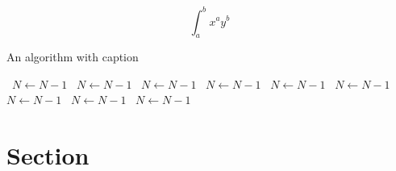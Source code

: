 \documentclass[a4paper]{article}
\begin{document}
\[ \int_{a}^{b}{x^{a}y^{b}} \]

\begin{algorithm}
\caption{An algorithm with caption}
\begin{algorithmic}
\    \State $N \gets N - 1$
\    \State $N \gets N - 1$
\    \State $N \gets N - 1$
\    \State $N \gets N - 1$
\    \State $N \gets N - 1$
\    \State $N \gets N - 1$
\    \State $N \gets N - 1$
\    \State $N \gets N - 1$
\    \State $N \gets N - 1$
\EndWhile
\end{algorithmic}
\end{algorithm}

\section{Section}
\end{document}
